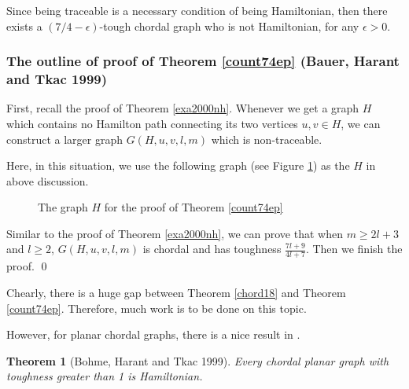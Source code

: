 \documentclass[12pt]{report}
\newtheorem{theorem}{Theorem}
\begin{document}
Since being traceable is a necessary condition of being Hamiltonian, then there exists a $(7/4-\epsilon)$-tough chordal graph who is not Hamiltonian, for any $\epsilon>0$.


\subsubsection{The outline of proof of Theorem \ref{count74ep} (Bauer, Harant and Tkac 1999)}


First, recall the proof of Theorem \ref{exa2000nh}. Whenever we get a graph $H$ which contains no Hamilton path connecting its two vertices $u,v\in H$, we can construct a larger graph $G(H,u,v,l,m)$ which is non-traceable. 

Here, in this situation, we use the following graph (see Figure \ref{t29pic}) as the $H$ in above discussion.

\begin{figure}[h]
\begin{center}
\caption{The graph $H$ for the proof of Theorem \ref{count74ep}}\label{t29pic}
\end{center}
\end{figure}
\newpage
Similar to the proof of Theorem \ref{exa2000nh}, we can prove that when $m\ge2l+3$ and $l\ge2$, $G(H,u,v,l,m)$ is chordal and has toughness $\frac{7l+9}{4l+7}$. Then we finish the proof.
\qed

Chearly, there is a huge gap between Theorem \ref{chord18} and Theorem \ref{count74ep}. Therefore, much work is to be done on this topic.

However, for planar chordal graphs, there is a nice result in \cite{bohme1999more}.
\begin{theorem}[Bohme, Harant and Tkac 1999]\label{plch}
Every chordal planar graph with toughness greater than 1 is Hamiltonian.
\end{theorem}
\end{document}
